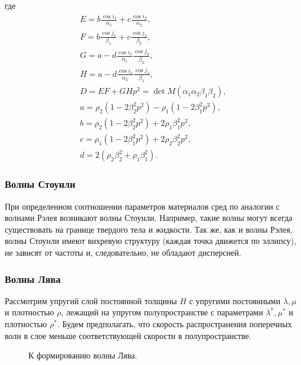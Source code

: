 где
\begin{eqnarray}
E = b \frac{\cos{i_1}}{\alpha_1} + c \frac{\cos{i_2}}{\alpha_2}, \\
F = b \frac{\cos{j_1}}{\beta_1} + c \frac{\cos{j_2}}{\beta_2}, \\
G = a - d \frac{\cos{i_1}}{\alpha_1} \frac{\cos{j_2}}{\beta_2}, \\
H = a - d \frac{\cos{i_2}}{\alpha_2} \frac{\cos{j_1}}{\beta_1}, \\
D = EF + GHp^2 = \det{M}(\alpha_1 \alpha_2 \beta_1 \beta_2), \\
a = \rho_2 (1 - 2 \beta_2^2 p^2) - \rho_1 (1 - 2 \beta_1^2 p^2), \\
b = \rho_2 (1 - 2 \beta_2^2 p^2) + 2 \rho_1 \beta_1^2 p^2, \\
c = \rho_1 (1 - 2 \beta_1^2 p^2) + 2 \rho_2 \beta_2^2 p^2, \\
d = 2 (\rho_2 \beta_2^2 + \rho_1 \beta_1^2).
\end{eqnarray}


\subsubsection{Волны Стоунли}

При определенном соотношении параметров материалов сред по аналогии с волнами Рэлея возникают волны Стоунли. Например, такие волны могут всегда существовать на границе твердого тела и жидкости. Так же, как и волны Рэлея, волны Стоунли имеют вихревую структуру (каждая точка движется по эллипсу), не зависят от частоты и, следовательно, не обладают дисперсией. 


\subsubsection{Волны Лява}

Рассмотрим упругий слой постоянной толщины $H$ с упругими постоянными $\lambda, \mu$ и плотностью $\rho$, лежащий на упругом полупространстве с параметрами $\lambda^*, \mu^*$ и плотностью $\rho^*$. Будем предполагать, что скорость распространения поперечных волн в слое меньше соответствующей скорости в полупространстве. 

\begin{figure}[h]
\caption{К формированию волны Лява.}
\end{figure}

